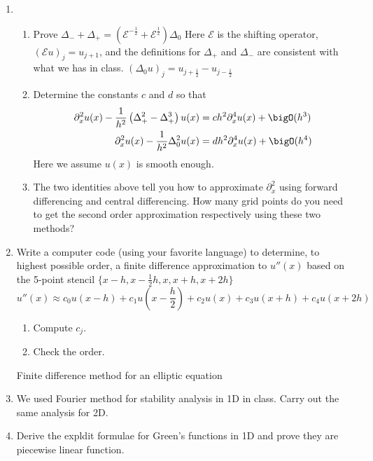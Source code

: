 \documentclass{article}
\newcommand\NoIndent[1]{%
  \begingroup
  \par
  \parshape0
  #1\par
  \endgroup
}
\begin{document}
\begin{enumerate}
	\item \begin{enumerate}
		\item Prove
			$\Delta_- + \Delta_+ =
				\left(\mathcal{E}^{-\frac{1}{2}} + \mathcal{E}^\frac{1}{2}\right)\Delta_0$
			Here $\mathcal{E}$ is the shifting operator, $\left(\mathcal{E}u\right)_j = u_{j+1}$,
			and the definitions for $\Delta_+$ and $\Delta_-$ are consistent with what we has in class.
			$\left(\Delta_0 u\right)_j = u_{j+\frac{1}{2}} - u_{j-\frac{1}{2}}$
		\item Determine the constants $c$ and $d$ so that
			\begin{align*}
				\partial_x^2 u(x) - \frac{1}{h^2}\left(\Delta_+^2 - \Delta_+^3\right)u(x)
					&= ch^2\partial_x^4 u(x) + \bigO(h^3) \\
				\partial_x^2 u(x) - \frac{1}{h^2}\Delta_0^2 u(x) &= dh^2\partial_x^4 u(x) + \bigO(h^4)
			\end{align*}
			Here we assume $u(x)$ is smooth enough.
		\item The two identities above tell you how to approximate $\partial_x^2$
			using forward differencing and central differencing.
			How many grid points do you need to get the second order approximation
			respectively using these two methods?
	\end{enumerate}

	\item Write a computer code (using your favorite language) to determine, to highest possible order,
		a finite difference approximation to $u''(x)$ based on the 5-point stencil
		$\{x-h,x-\frac{1}{2}h,x,x+h,x+2h\}$
		\begin{equation*}
			u''(x) \approx
				c_0 u(x-h) + c_1 u\left(x-\frac{h}{2}\right) + c_2 u(x) + c_3 u(x+h) + c_4 u(x+2h)
		\end{equation*}
		\begin{enumerate}
			\item Compute $c_j$.
			\item Check the order.
		\end{enumerate}

\NoIndent{Finite difference method for an elliptic equation}

	\item We used Fourier method for stability analysis in 1D in class.
		Carry out the same analysis for 2D.

	\item Derive the expldit formulae for Green's functions in 1D
		and prove they are piecewise linear function.


\end{enumerate}
\end{document}
